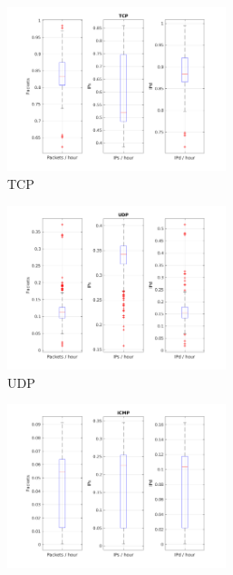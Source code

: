 \documentclass{article}
\begin{document}
\begin{figure}[h]
    \begin{subfigure}{.5\textwidth}
        \centering
        \includegraphics[width=0.7\textwidth]{../exercise-3/plots/rep_17_TCP}
        \caption{TCP}
    \end{subfigure}
    \begin{subfigure}{.5\textwidth}
        \centering
        \includegraphics[width=0.7\textwidth]{../exercise-3/plots/rep_17_UDP}
        \caption{UDP}
    \end{subfigure}
    \begin{subfigure}{.5\textwidth}
        \centering
        \includegraphics[width=0.7\textwidth]{../exercise-3/plots/rep_17_ICMP}

\end{subfigure}
\end{figure}
\end{document}
